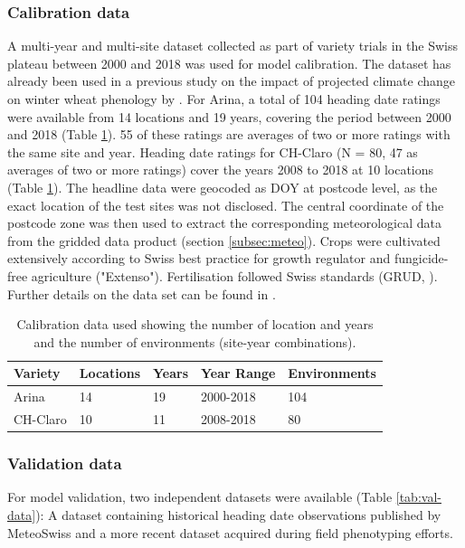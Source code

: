 \subsubsection{Calibration data}
\label{subsubsec:hd-cal-data}
A multi-year and multi-site dataset collected as part of variety trials in the Swiss plateau between 2000 and 2018 was used for model calibration. The dataset has already been used in a previous study on the impact of projected climate change on winter wheat phenology by \cite{rogger_can_2021}. For Arina, a total of 104 heading date ratings were available from 14 locations and 19 years, covering the period between 2000 and 2018 (Table \ref{tab:cal-data}). 55 of these ratings are averages of two or more ratings with the same site and year. Heading date ratings for CH-Claro (N = 80, 47 as averages of two or more ratings) cover the years 2008 to 2018 at 10 locations (Table \ref{tab:cal-data}). The headline data were geocoded as \gls{DOY} at postcode level, as the exact location of the test sites was not disclosed. The central coordinate of the postcode zone was then used to extract the corresponding meteorological data from the gridded data product (section \ref{subsec:meteo}). Crops were cultivated extensively according to Swiss best practice for growth regulator and fungicide-free agriculture ("Extenso"). Fertilisation followed Swiss standards (GRUD, \cite{carlen_grundlagen_2017}). Further details on the data set can be found in \cite{rogger_can_2021}.

\begin{table}[H]
\caption{Calibration data used showing the number of location and years and the number of environments (site-year combinations).}
\centering
\label{tab:cal-data}
\begin{tabular}{@{}lllll@{}}
\toprule
\textbf{Variety}  & \textbf{Locations} & \textbf{Years} & \textbf{Year Range} & \textbf{Environments}   \\ \midrule
Arina    & 14        & 19    & 2000-2018  & 104 \\
CH-Claro & 10        & 11    & 2008-2018  & 80  \\ \bottomrule
\end{tabular}
\end{table}

\subsubsection{Validation data}
\label{subsubsec:hd-val-data}
For model validation, two independent datasets were available (Table \ref{tab:val-data}): A dataset containing historical heading date observations published by MeteoSwiss and a more recent dataset acquired during field phenotyping efforts.

